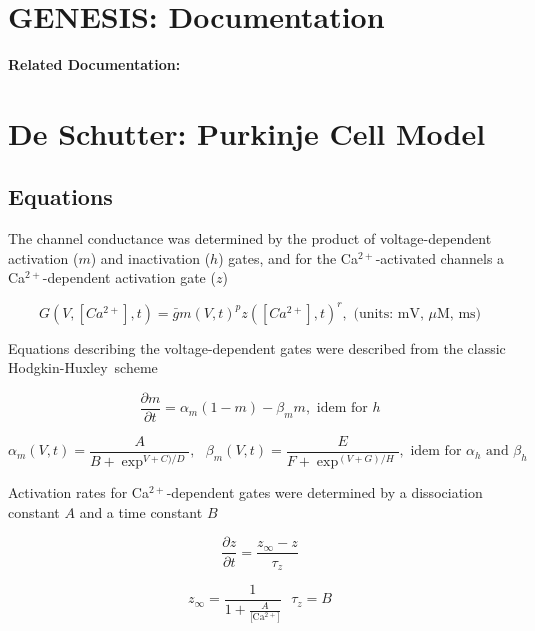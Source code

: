 \documentclass[12pt]{article}
\begin{document}
\section*{GENESIS: Documentation}

{\bf Related Documentation:}

\section*{De Schutter: Purkinje Cell Model}

\subsection*{Equations}

The channel conductance was
determined by the product of voltage-dependent activation ($m$)
and inactivation ($h$) gates, and for the Ca$^{2+}$-activated channels
a Ca$^{2+}$-dependent activation gate ($z$)

\begin{equation}
   G(V,[Ca^{2+}], t) = \bar gm(V, t)^p z([Ca^{2+}], t)^r, \mbox{        (units: mV, $\mu$M, ms)}
\end{equation}

Equations describing the voltage-dependent gates were described from the classic Hodgkin-Huxley\,\cite{L:1952fv} scheme

\begin{equation}
   \frac{\partial m}{\partial t} = \alpha_m(1-m) - \beta_mm, \mbox{        idem for $h$}
\end{equation}

\begin{equation}
   \alpha_m(V,t) = \frac{A}{B+\exp^{V+C)/D}}, \mbox{        }\beta_m(V,t) = \frac{E}{F+\exp^{(V+G)/H}}, \mbox{        idem for $\alpha_h$ and $\beta_h$}
\end{equation}

Activation rates for Ca$^{2+}$-dependent gates were determined by a dissociation constant $A$ and a time constant $B$

\begin{equation}
   \frac{\partial z}{\partial t} = \frac{z_\infty - z}{\tau_z}
\end{equation}

\begin{equation}
   z_\infty = \frac{1}{1+\frac{A}{\mbox{[Ca$^{2+}$]}}} \mbox{        }\tau_z = B
\end{equation}
\end{document}
